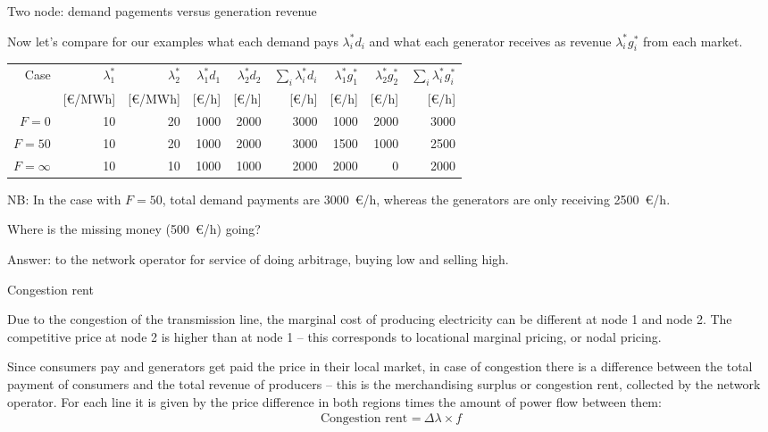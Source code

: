 \documentclass[10pt,aspectratio=169,dvipsnames]{beamer}
\newcommand{\ra}[1]{\renewcommand{\arraystretch}{#1}}
\def\l{\lambda}
\begin{document}
\begin{frame}{Two node: demand pagements versus generation revenue}

  Now let's compare for our examples what each demand pays $\l_i^*d_i$ and what each generator receives as revenue $\l_i^*g_i^*$ from each market.
  \ra{1.1}
  \begin{table}[!t]
    \begin{tabular}{rrrrrrrrr}
      \toprule
      Case & $\l_1^*$  & $\l_2^*$ & $\l_1^*d_1$ & $\l_2^*d_2$ & $\sum_i \l_i^*d_i$ & $\l_1^*g_1^*$  & $\l_2^*g_2^*$ & $\sum_i \l_i^*g_i^*$ \\
       & [\euro/MWh] &  [\euro/MWh] & [\euro/h] & [\euro/h] & [\euro/h] & [\euro/h] & [\euro/h] & [\euro/h] \\
      \midrule
      $F = 0$ & 10 & 20 & 1000 & 2000 & 3000 & 1000 & 2000 & 3000 \\
      $F = 50$ & 10 & 20 & 1000 & 2000 & 3000 & 1500 & 1000 & 2500 \\
      $F = \infty$ & 10 & 10 & 1000 & 1000 & 2000 & 2000 & 0 & 2000 \\
      \bottomrule
    \end{tabular}
  \end{table}

  NB: In the case with $F=50$, total demand payments are 3000~\euro/h, whereas the generators are only receiving 2500~\euro/h.

  Where is the missing money (500~\euro/h) going?

  Answer: to the network operator for service of doing arbitrage, buying low and selling high.

\end{frame}




\begin{frame}{Congestion rent}

Due to the congestion of the transmission line, the marginal cost of producing electricity can be different at node 1 and node 2. The competitive price at node 2 is higher than at node 1 -- this corresponds to \alert{locational marginal pricing}, or \alert{nodal pricing}.

Since consumers pay and generators get paid the price in their local market, in case of congestion there is a difference between the total payment of consumers and the total revenue of producers -- this is the \alert{merchandising surplus} or \alert{congestion rent}, collected by the network operator. For each line it is given by the price difference in both regions times the amount of power flow between them:
\begin{align*}
\text{Congestion rent =}\:\Delta \lambda\times f
\end{align*}


\end{frame}
\end{document}
